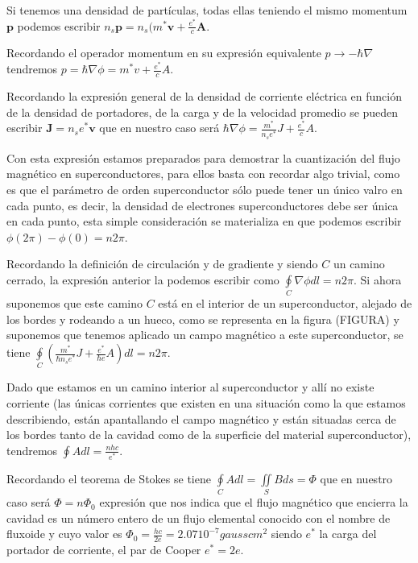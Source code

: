 Si tenemos una densidad de partículas, todas ellas teniendo el mismo momentum $\mathbf{p}$ podemos escribir $n_s \mathbf{p} = n_s (m^* \mathbf{v} + \frac{e^*}{c} \mathbf{A}$.

Recordando el operador momentum en su expresión equivalente $p \rightarrow -\hbar \nabla$ tendremos $p = \hbar \nabla \phi = m^* v + \frac{e^*}{c} A$.

Recordando la expresión general de la densidad de corriente eléctrica en función de la densidad de portadores, de la carga y de la velocidad promedio se pueden escribir $\mathbf{J} = n_s e^* \mathbf{v}$ que en nuestro caso será $\hbar \nabla \phi = \frac{m^*}{n_s e^*} J + \frac{e^*}{c} A$.

Con esta expresión estamos preparados para demostrar la cuantización del flujo magnético en superconductores, para ellos basta con recordar algo trivial, como es que el parámetro de orden superconductor sólo puede tener un único valro en cada punto, es decir, la densidad de electrones superconductores debe ser única en cada punto, esta simple consideración se materializa en que podemos escribir $\phi(2\pi) - \phi(0) = n 2 \pi$.

Recordando la definición de circulación y de gradiente y siendo $C$ un camino cerrado, la expresión anterior la podemos escribir como $\oint\limits_C \nabla \phi dl = n 2 \pi$. Si ahora suponemos que este camino $C$ está en el interior de un superconductor, alejado de los bordes y rodeando a un hueco, como se representa en la figura (FIGURA) y suponemos que tenemos aplicado un campo magnético a este superconductor, se tiene $\oint\limits_C (\frac{m^*}{\hbar n_s e^*} J + \frac{e^*}{\hbar e} A) dl = n 2 \pi$.

Dado que estamos en un camino interior al superconductor y allí no existe corriente (las únicas corrientes que existen en una situación como la que estamos describiendo, están apantallando el campo magnético y están situadas cerca de los bordes tanto de la cavidad como de la superficie del material superconductor), tendremos $\oint A dl = \frac{n h c}{e^*}$.

Recordando el teorema de Stokes se tiene $\oint\limits_C A dl = \iint\limits_S B ds = \Phi$ que en nuestro caso será $\Phi = n \Phi_0$ expresión que nos indica que el flujo magnético que encierra la cavidad es un número entero de un flujo elemental conocido con el nombre de fluxoide y cuyo valor es $\Phi_0 = \frac{h c}{2 e} = 2.07 10^{-7} gauss cm^2$ siendo $e^*$ la carga del portador de corriente, el par de Cooper $e^* = 2e$.

